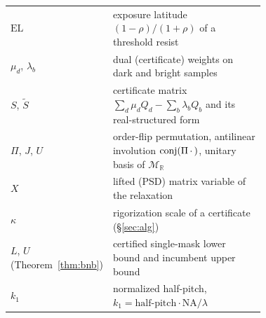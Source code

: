 \documentclass[11pt,a4paper]{article}
\newcommand{\R}{\mathbb{R}}\newcommand{\C}{\mathbb{C}}\newcommand{\PSD}{\succeq 0}
\newcommand{\NA}{\mathrm{NA}}
\newcommand{\EL}{\mathrm{EL}}
\begin{document}
\begin{table}[tbp]
\begin{tabular}{@{}lp{0.72\linewidth}@{}}
$\EL$ & exposure latitude $(1-\rho)/(1+\rho)$ of a threshold resist\\
$\mu_d$, $\lambda_b$ & dual (certificate) weights on dark and bright samples\\
$S$, $\tilde S$ & certificate matrix $\sum_d\mu_dQ_d-\sum_b\lambda_bQ_b$ and its real-structured form\\
$\Pi$, $J$, $U$ & order-flip permutation, antilinear involution $\operatorname{conj}(\Pi\,\cdot\,)$, unitary basis of $\mathcal M_\R$\\
$X$ & lifted (PSD) matrix variable of the relaxation\\
$\kappa$ & rigorization scale of a certificate (\S\ref{sec:alg})\\
$L$, $U$ (Theorem~\ref{thm:bnb}) & certified single-mask lower bound and incumbent upper bound\\
$k_1$ & normalized half-pitch, $k_1=\text{half-pitch}\cdot\NA/\lambda$\\
\bottomrule\end{tabular}\end{table}
\end{document}
